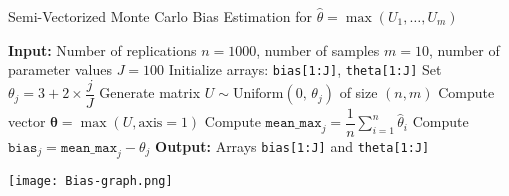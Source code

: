 \documentclass[8pt]{beamer}
\begin{document}
\begin{frame}[fragile]
\begin{algorithm}[H]
\caption{Semi-Vectorized Monte Carlo Bias Estimation for $\hat{\theta} = \max(U_1, \ldots, U_m)$}
\begin{algorithmic}[1]
  \State \textbf{Input:} Number of replications $n = 1000$, number of samples $m = 10$, number of parameter values $J = 100$
  \State Initialize arrays: \texttt{bias[1:J]}, \texttt{theta[1:J]}
    \State Set $\theta_j = 3 + 2 \times \dfrac{j}{J}$
    \State Generate matrix $U \sim \text{Uniform}(0,\, \theta_j)$ of size $(n, m)$
    \State Compute vector $\hat{\boldsymbol{\theta}} = \max(U, \text{axis}=1)$
    \State Compute $\texttt{mean\_max}_j = \dfrac{1}{n} \sum_{i=1}^{n} \hat{\theta}_i$
    \State Compute $\texttt{bias}_j = \texttt{mean\_max}_j - \theta_j$
  \EndFor
  \State \textbf{Output:} Arrays \texttt{bias[1:J]} and \texttt{theta[1:J]}
\end{algorithmic}
\end{algorithm}
\end{frame}

\begin{frame}
\begin{center}
\texttt{[image: Bias-graph.png]}
\end{center}
\end{frame}
\end{document}
